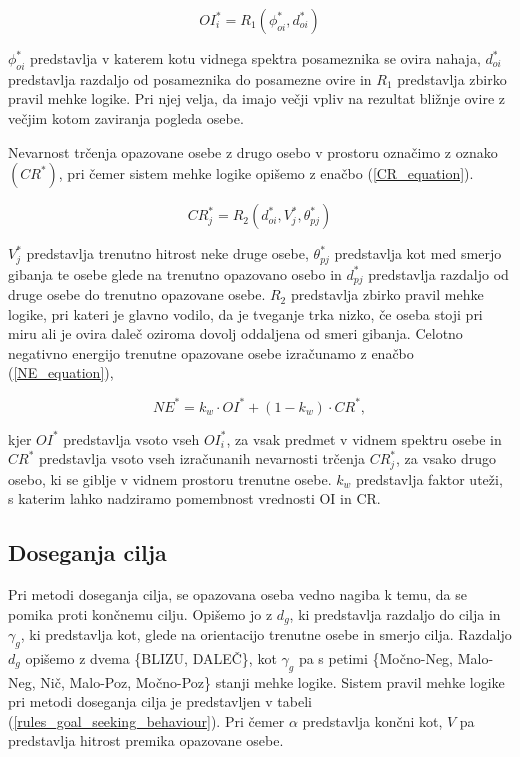 \documentclass[9pt]{pnas-new}
\begin{document}
\begin{equation}
\label{OI_equation}
OI_{i}^* = R_{1}(\phi^*_{oi}, d^*_{oi})
\end{equation}

\noindent ${\phi^*_{oi}}$ predstavlja v katerem kotu vidnega spektra posameznika se ovira nahaja, ${d^*_{oi}}$ predstavlja razdaljo od posameznika do posamezne ovire in ${R_{1}}$ predstavlja zbirko pravil mehke logike. Pri njej velja, da imajo večji vpliv na rezultat bližnje ovire z večjim kotom zaviranja pogleda osebe.


Nevarnost trčenja opazovane osebe z drugo osebo v prostoru označimo z oznako ${(CR^*)}$, pri čemer sistem mehke logike opišemo z enačbo (\ref{CR_equation}).

\begin{equation}
\label{CR_equation}
CR_{j}^* = R_{2}(d^*_{oi}, V_{j}^*, \theta_{pj}^*)
\end{equation}

\noindent ${V_{j}^*}$ predstavlja trenutno hitrost neke druge osebe, ${\theta_{pj}^*}$ predstavlja kot med smerjo gibanja te osebe glede na trenutno opazovano osebo in ${d^*_{pj}}$ predstavlja razdaljo od druge osebe do trenutno opazovane osebe. ${R_{2}}$ predstavlja zbirko pravil mehke logike, pri kateri je glavno vodilo, da je tveganje trka nizko, če oseba stoji pri miru ali je ovira daleč oziroma dovolj oddaljena od smeri gibanja. Celotno negativno energijo trenutne opazovane osebe izračunamo z enačbo (\ref{NE_equation}),

\begin{equation}
\label{NE_equation}
NE^* = k_{w} \cdot OI^* + (1 - k_{w}) \cdot CR^*,
\end{equation}

\noindent kjer ${OI^*}$ predstavlja vsoto vseh ${OI_{i}^*}$, za vsak predmet v vidnem spektru osebe in ${CR^*}$ predstavlja vsoto vseh izračunanih nevarnosti trčenja ${CR_{j}^*}$, za vsako drugo osebo, ki se giblje v vidnem prostoru trenutne osebe. ${k_{w}}$ predstavlja faktor uteži, s katerim lahko nadziramo pomembnost vrednosti OI in CR.


\subsection*{Doseganja cilja}
\label{doseganje_cilja}
Pri metodi doseganja cilja, se opazovana oseba vedno nagiba k temu, da se pomika proti končnemu cilju. Opišemo jo z ${d_g}$, ki predstavlja razdaljo do cilja in ${\gamma_{g}}$, ki predstavlja kot, glede na orientacijo trenutne osebe in smerjo cilja. Razdaljo ${d_g}$ opišemo z dvema \{BLIZU, DALEČ\}, kot ${\gamma_{g}}$ pa s petimi \{Močno-Neg, Malo-Neg, Nič, Malo-Poz, Močno-Poz\} stanji mehke logike. Sistem pravil mehke logike pri metodi doseganja cilja je predstavljen v tabeli (\ref{rules_goal_seeking_behaviour}). Pri čemer ${\alpha}$ predstavlja končni kot, $V$ pa predstavlja hitrost premika opazovane osebe.
\end{document}
